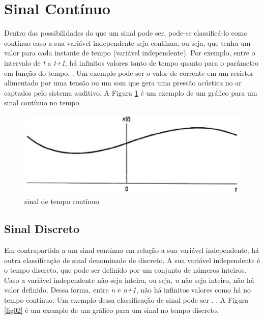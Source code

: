 \section{Sinal Contínuo}
Dentro das possibilidades do que um sinal pode ser, pode-se classificá-lo como contínuo caso a sua variável independente seja contínua, ou seja, que tenha um valor para cada instante de tempo (variável independente). Por exemplo, entre o intervalo de \textit{t} a \textit{t+1}, há infinitos valores tanto de tempo quanto para o parâmetro em função do tempo, \cite{oppenheim2010sinais}. Um exemplo pode ser o valor de corrente em um resistor alimentado por uma tensão ou um som que gera uma pressão acústica no ar captados pelo sistema auditivo. A Figura \ref{fig01} é um exemplo de um gráfico para um sinal contínuo no tempo. 

\begin{figure}[h]
	\centering
	\includegraphics[scale=0.5]{figuras/fig01.eps}
	\caption{sinal de tempo contínuo}
	\label{fig01}
\end{figure}
\newpage

\subsection{Sinal Discreto}
Em contrapartida a um sinal contínuo em relação a sua variável independente, há outra classificação de sinal denominado de discreto. A sua variável independente é o tempo discreto, que pode ser definido por um conjunto de números inteiros. Caso a variável independente não seja inteira, ou seja, \textit{n} não seja inteiro, não há  valor definido. Dessa forma, entre \textit{n} e \textit{n+1}, não há infinitos valores como há no tempo contínuo. Um exemplo dessa classificação de sinal pode ser . \cite{oppenheim2010sinais}. A Figura \ref{fig02} é um exemplo de um gráfico para um sinal no tempo discreto. 


